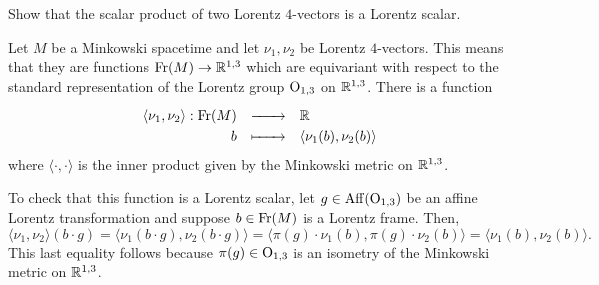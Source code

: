 \documentclass{../../templates/lkx_pset}
\begin{document}
\begin{problem}{1}
Show that the scalar product of two Lorentz $4$-vectors is a Lorentz scalar.
\end{problem}
\begin{solution}
	Let $M$ be a Minkowski spacetime and let $\nu_1, \nu_2$ be Lorentz $4$-vectors. This means that they are functions $\mathrm{Fr}(M) \to \mathbb{R}^{1,3}$ which are equivariant with respect to the standard representation of the Lorentz group $\mathrm{O}_{1,3}$ on $\mathbb{R}^{1,3}$. There is a function
	\[
		\definefunction{\langle \nu_1, \nu_2 \rangle}{\Frame(M)}{\R}{b}{\langle \nu_1(b), \nu_2(b)\rangle}
	\]
	where $\langle\cdot, \cdot\rangle$ is the inner product given by the Minkowski metric on $\mathbb{R}^{1,3}$.

	To check that this function is a Lorentz scalar, let $g\in \mathrm{Aff}(\mathrm{O}_{1,3})$ be an affine Lorentz transformation and suppose $b \in \mathrm{Fr}(M)$ is a Lorentz frame. Then,
	\[
		\langle\nu_1,\nu_2\rangle(b\cdot g) = \langle \nu_1(b\cdot g), \nu_2(b\cdot g)\rangle = \langle \pi(g)\cdot \nu_1(b), \pi(g)\cdot \nu_2(b)\rangle = \langle \nu_1(b), \nu_2(b)\rangle.
	\]
	This last equality follows because $\pi(g)\in \mathrm{O}_{1,3}$ is an isometry of the Minkowski metric on $\mathbb{R}^{1,3}$.
\end{solution}
\end{document}
